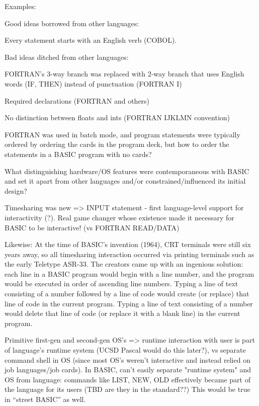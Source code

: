 \documentclass{article}
\begin{document}
Examples:

Good ideas borrowed from other languages:

Every statement starts with an English verb (COBOL).

Bad ideas ditched from other languages:

FORTRAN's 3-way branch was replaced with 2-way branch that uses English words (IF,
THEN) instead of punctuation (FORTRAN I)

Required declarations (FORTRAN and others)

No distinction between floats and ints (FORTRAN IJKLMN convention)

FORTRAN was used in batch mode, and program statements were typically
ordered by ordering the cards in the program deck, but how to order the
statements in a BASIC program with no cards?

What distinguishing hardware/OS features were contemporaneous with BASIC
and set it apart from other languages and/or constrained/influenced its
initial design?

Timesharing was new => INPUT statement - first language-level support for
   interactivity  (?).  Real game changer whose existence made it necessary
for BASIC to be interactive!  (vs FORTRAN READ/DATA)


Likewise: At the time of BASIC's invention (1964), CRT terminals were still six
years away, so all timesharing interaction occurred via printing
terminals such as the early Teletype ASR-33.
The creators came up with an ingenious solution: each line in a BASIC
program would begin with a line number, and the program would be
executed in order of ascending line numbers.
Typing a line of text consisting of a number followed by a line of code
would create (or replace) that line of code in the current program.
Typing a line of text consisting of a number would delete that line of
code (or replace it with a blank line) in the current program.


Primitive first-gen and second-gen OS's => runtime interaction with user
is part of language's runtime system (UCSD Pascal would do this later?),
vs separate command shell in OS (since most OS's weren't interactive and
instead relied on job languages/job cards).
In BASIC, can't easily separate "runtime system" and OS from language: commands
like LIST, NEW, OLD effectively became part of the language for its
users (TBD are they in the standard??)  This would be true in ``street
BASIC'' as well.
\end{document}
